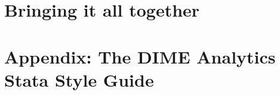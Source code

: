 
\chapter{Bringing it all together}




\chapter{Appendix: The DIME Analytics Stata Style Guide}
\label{ap:1}





\backmatter




\printindex %


